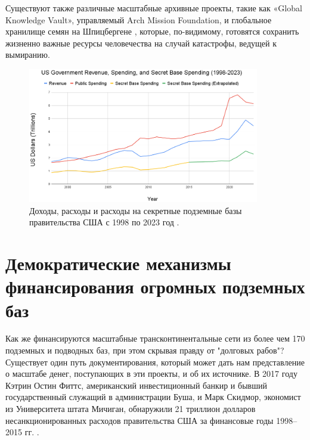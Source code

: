 \documentclass[10pt,twocolumn,letterpaper]{article}
\begin{document}
Существуют также различные масштабные архивные проекты, такие как «Global Knowledge Vault», управляемый Arch Mission Foundation, \cite{29} и глобальное хранилище семян на Шпицбергене \cite{30}, которые, по-видимому, готовятся сохранить жизненно важные ресурсы человечества на случай катастрофы, ведущей к вымиранию.
\begin{figure}[t]
\begin{center}
\includegraphics[width=0.9\textwidth]{govcrop2.png}
\end{center}
   \caption{Доходы, расходы и расходы на секретные подземные базы правительства США с 1998 по 2023 год \cite{19}.}
   \label{fig:9}
\end{figure}

\section{Демократические механизмы финансирования огромных подземных баз}

Как же финансируются масштабные трансконтинентальные сети из более чем 170 подземных и подводных баз, при этом скрывая правду от "долговых рабов"? Существует один путь документирования, который может дать нам представление о масштабе денег, поступающих в эти проекты, и об их источнике. В 2017 году Кэтрин Остин Фиттс, американский инвестиционный банкир и бывший государственный служащий в администрации Буша, и Марк Скидмор, экономист из Университета штата Мичиган, обнаружили 21 триллион долларов несанкционированных расходов правительства США за финансовые годы 1998–2015 гг. \cite{11,12,13}.
\end{document}
